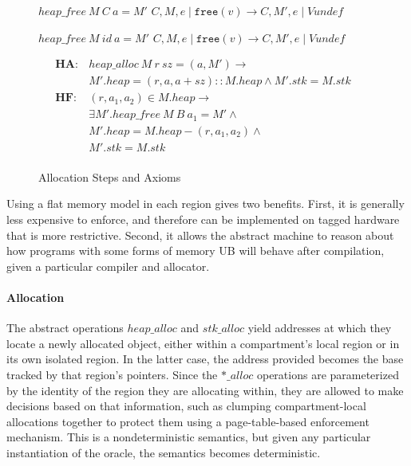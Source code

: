 \begin{figure}
\begin{minipage}[t]{0.54\textwidth}
              {\(\mathit{heap\_free} ~ M ~ C ~ a = M'\)}
              {\(C,M,e \mid \mathtt{free}(v) \longrightarrow
                C,M',e \mid \mathit{Vundef}\)}

             {\(\mathit{heap\_free} ~ M ~ id ~ a = M'\)}
             {\(C,M,e \mid \mathtt{free}(v)  \longrightarrow
               C,M',e \mid \mathit{Vundef}\)}
             
  \[\begin{aligned}
    \mathbf{HA} : & \mathit{heap\_alloc} ~ M ~ r ~ sz = (a, M') \rightarrow & \\
    & M'.heap = (r,a,a+sz)::M.heap \land M'.stk = M.stk & \\[0.75em]
    \mathbf{HF} : & (r,a_1,a_2) \in M.heap \rightarrow & \\
    & \exists M' . \mathit{heap\_free} ~ M ~ B ~ a_1 = M' \land & \\
    & M'.heap = M.heap-(r,a_1,a_2) \land & \\
    & M'.stk = M.stk & \\[0.75em]
  \end{aligned}\]
  \end{minipage}

  \caption{Allocation Steps and Axioms}
  \label{ch5:subfig:alstep}
\end{figure}


Using a flat memory model in each region gives two benefits. First, it is generally
less expensive to enforce, and therefore can be implemented on tagged hardware that is more
restrictive. Second, it allows the abstract machine to reason about how programs with some
forms of memory UB will behave after compilation, given a particular compiler and allocator.

\paragraph{Allocation}

The abstract operations \(\mathit{heap\_alloc}\) and \(\mathit{stk\_alloc}\)
yield addresses at which they locate a newly allocated object, either within a
compartment's local region or in its own isolated region. In the latter case,
the address provided becomes the base tracked by that region's pointers.
Since the \(\mathit{*\_alloc}\) operations are parameterized by the identity of
the region they are allocating within, they are allowed to make decisions based on that
information, such as clumping compartment-local allocations together to 
protect them using a page-table-based enforcement mechanism.
This is a nondeterministic semantics, but given any particular instantiation of
the oracle, the semantics becomes deterministic.

